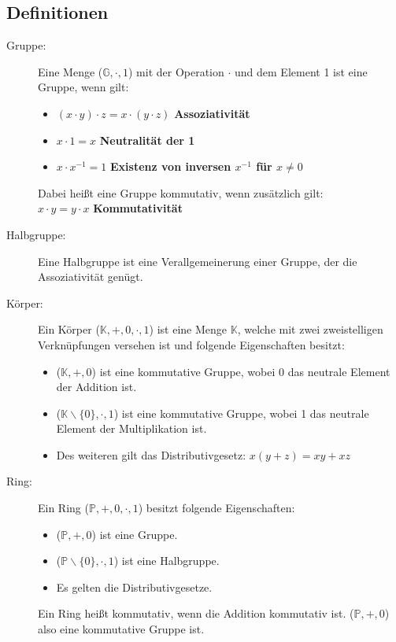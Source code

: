 
\subsection*{Definitionen}
\begin{description}  
  \item [Gruppe:] 
    Eine Menge ($\mathbb{G},\cdot, 1$) mit der Operation $\cdot$ und dem Element
    1 ist eine Gruppe, wenn gilt:
    \begin{itemize}
      \item $(x \cdot y) \cdot z = x \cdot (y \cdot z)$ \textbf{Assoziativität}
      \item $x \cdot 1 = x$ \textbf{Neutralität der 1}
      \item $x \cdot x^{-1} = 1$ \textbf{Existenz von inversen $x^{-1}$ für 
            $x \neq 0$}
    \end{itemize}
    Dabei heißt eine Gruppe kommutativ, wenn zusätzlich gilt:\\
    $x \cdot y = y \cdot x$ \textbf{Kommutativität}

  \item [Halbgruppe:]
    Eine Halbgruppe ist eine Verallgemeinerung einer Gruppe, der die 
    Assoziativität genügt.

  \item [Körper:]
    Ein Körper ($\mathbb{K}, +, 0, \cdot, 1$) ist eine Menge $\mathbb{K}$, 
    welche mit zwei zweistelligen Verknüpfungen versehen ist und folgende 
    Eigenschaften besitzt:
    \begin{itemize}
      \item ($\mathbb{K}, +, 0$) ist eine kommutative Gruppe, wobei 0 das
            neutrale Element der Addition ist.
      \item ($\mathbb{K}\backslash \{0\}, \cdot, 1$) ist eine kommutative 
            Gruppe, wobei 1 das neutrale Element der Multiplikation ist.
      \item Des weiteren gilt das Distributivgesetz:
            $x(y + z) = xy + xz$
    \end{itemize}

  \item [Ring:]
    Ein Ring ($\mathbb{P}, +, 0, \cdot, 1$) besitzt folgende Eigenschaften:
    \begin{itemize}
      \item ($\mathbb{P}, +, 0$) ist eine Gruppe.
      \item ($\mathbb{P}\backslash\{0\}, \cdot, 1$) ist eine Halbgruppe.
      \item Es gelten die Distributivgesetze.
    \end{itemize}
    Ein Ring heißt kommutativ, wenn die Addition kommutativ ist. 
    ($\mathbb{P}, +, 0$) also eine kommutative Gruppe ist.


\end{description}
